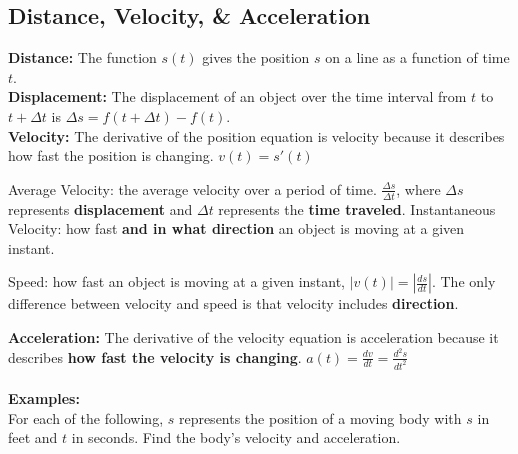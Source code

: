 \documentclass[addpoints, 12pt]{exam}
\begin{document}
\subsection*{Distance, Velocity, \& Acceleration}
\noindent\textbf{Distance:} The function $s(t)$ gives the position $s$ on a line as a function of time $t$.\\
\noindent\textbf{Displacement:} The displacement of an object over the time interval from $t$ to $t+\Delta t$ is $\Delta s=f(t+\Delta t)-f(t)$.\\
\noindent\textbf{Velocity:} The derivative of the position equation is velocity because it describes how fast the position is changing. $v(t)=s'(t)$
\begin{questions}
    \question Average Velocity: the average velocity over a period of time. $\displaystyle\frac{\Delta s}{\Delta t}$, where $\Delta s$ represents \textbf{displacement} and $\Delta t$ represents the \textbf{time traveled}.
    \vspace{.1cm}
    \question Instantaneous Velocity: how fast \textbf{and in what direction} an object is moving at a given instant.
    \question Speed: how fast an object is moving at a given instant, $\displaystyle |v(t)|=\left|\frac{ds}{dt}\right|$. The only difference between velocity and speed is that velocity includes \textbf{direction}.
\end{questions}
\noindent\textbf{Acceleration:} The derivative of the velocity equation is acceleration because it describes \textbf{how fast the velocity is changing}. $\displaystyle a(t)=\frac{dv}{dt}=\frac{d^2 s}{dt^2}$\\
\\
\noindent\textbf{Examples:}\\
For each of the following, $s$ represents the position of a moving body with $s$ in feet and $t$ in seconds. Find the body's velocity and acceleration.
\end{document}
